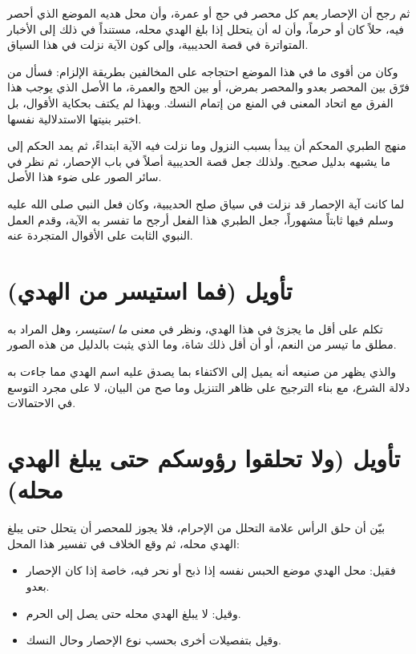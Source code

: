 ثم رجح  أن الإحصار يعم كل محصر في حج أو عمرة، وأن محل هديه الموضع الذي أحصر فيه، حلاً كان أو حرماً، وأن له أن يتحلل إذا بلغ الهدي محله، مستنداً في ذلك إلى الأخبار المتواترة في قصة الحديبية، وإلى كون الآية نزلت في هذا السياق.

وكان من أقوى ما في هذا الموضع احتجاجه على المخالفين بطريقة الإلزام: فسأل من فرّق بين المحصر بعدو والمحصر بمرض، أو بين الحج والعمرة، ما الأصل الذي يوجب هذا الفرق مع اتحاد المعنى في المنع من إتمام النسك. وبهذا لم يكتف بحكاية الأقوال، بل اختبر بنيتها الاستدلالية نفسها.

\begin{fawaid}
منهج الطبري المحكم أن يبدأ بسبب النزول وما نزلت فيه الآية ابتداءً، ثم يمد الحكم إلى ما يشبهه بدليل صحيح. ولذلك جعل قصة الحديبية أصلاً في باب الإحصار، ثم نظر في سائر الصور على ضوء هذا الأصل.
\end{fawaid}

\begin{fawaid}
لما كانت آية الإحصار قد نزلت في سياق صلح الحديبية، وكان فعل النبي صلى الله عليه وسلم فيها ثابتاً مشهوراً، جعل الطبري هذا الفعل أرجح ما تفسر به الآية، وقدم العمل النبوي الثابت على الأقوال المتجردة عنه.
\end{fawaid}

\section{تأويل (فما استيسر من الهدي)}
تكلم  على أقل ما يجزئ في هذا الهدي، ونظر في معنى \textit{ما استيسر}، وهل المراد به مطلق ما تيسر من النعم، أو أن أقل ذلك شاة، وما الذي يثبت بالدليل من هذه الصور.

والذي يظهر من صنيعه أنه يميل إلى الاكتفاء بما يصدق عليه اسم الهدي مما جاءت به دلالة الشرع، مع بناء الترجيح على ظاهر التنزيل وما صح من البيان، لا على مجرد التوسع في الاحتمالات.

\section{تأويل (ولا تحلقوا رؤوسكم حتى يبلغ الهدي محله)}
بيّن  أن حلق الرأس علامة التحلل من الإحرام، فلا يجوز للمحصر أن يتحلل حتى يبلغ الهدي محله، ثم وقع الخلاف في تفسير هذا المحل:
\begin{itemize}
    \item فقيل: محل الهدي موضع الحبس نفسه إذا ذبح أو نحر فيه، خاصة إذا كان الإحصار بعدو.
    \item وقيل: لا يبلغ الهدي محله حتى يصل إلى الحرم.
    \item وقيل بتفصيلات أخرى بحسب نوع الإحصار وحال النسك.
\end{itemize}

